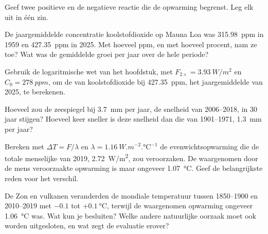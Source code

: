 \begin{exercise}[$\star$]\label{exo:g12:climate-change:5}
Geef twee positieve  en de negatieve reactie die
de opwarming begrenst. Leg elk uit in één zin.
\end{exercise}

\begin{exercise}[$\star\star$]\label{exo:g12:climate-change:6}
De jaargemiddelde concentratie koolstofdioxide op Mauna Loa was
\qty{315.98}{ppm} in 1959 en \qty{427.35}{ppm} in 2025. Met hoeveel ppm,
en met hoeveel procent, nam ze toe? Wat was de gemiddelde groei per
jaar over de hele periode?
\end{exercise}

\begin{exercise}[$\star\star$]\label{exo:g12:climate-change:7}
Gebruik de logaritmische wet van het hoofdstuk, met $F_{2\times} =
\qty{3.93}{W/m^2}$ en $C_0 = \qty{278}{ppm}$, om de  van
koolstofdioxide bij \qty{427.35}{ppm}, het jaargemiddelde van 2025, te berekenen.
\end{exercise}

\begin{exercise}[$\star\star$]\label{exo:g12:climate-change:8}
Hoeveel zou de zeespiegel bij \qty{3.7}{mm} per jaar, de snelheid van 2006--2018,
in 30 jaar stijgen? Hoeveel keer sneller is deze snelheid dan die van
1901--1971, \qty{1.3}{mm} per jaar?
\end{exercise}

\begin{exercise}[$\star\star$]\label{exo:g12:climate-change:9}
Bereken met $\Delta T = F/\lambda$ en $\lambda = \qty{1.16}{W.m^{-2}.\degreeCelsius^{-1}}$
de evenwichtsopwarming die de totale menselijke  van 2019,
\qty{2.72}{W/m^2}, zou veroorzaken. De waargenomen door de mens veroorzaakte opwarming is maar
ongeveer \qty{1.07}{\degreeCelsius}. Geef de belangrijkste reden voor het verschil.
\end{exercise}

\begin{exercise}[$\star\star$]\label{exo:g12:climate-change:10}
De Zon en vulkanen veranderden de mondiale temperatuur tussen 1850--1900 en
2010--2019 met $-0.1$ tot $+\qty{0.1}{\degreeCelsius}$, terwijl de waargenomen
opwarming ongeveer \qty{1.06}{\degreeCelsius} was. Wat kun je besluiten? Welke
andere natuurlijke oorzaak moet ook worden uitgesloten, en wat zegt de evaluatie
erover?
\end{exercise}

